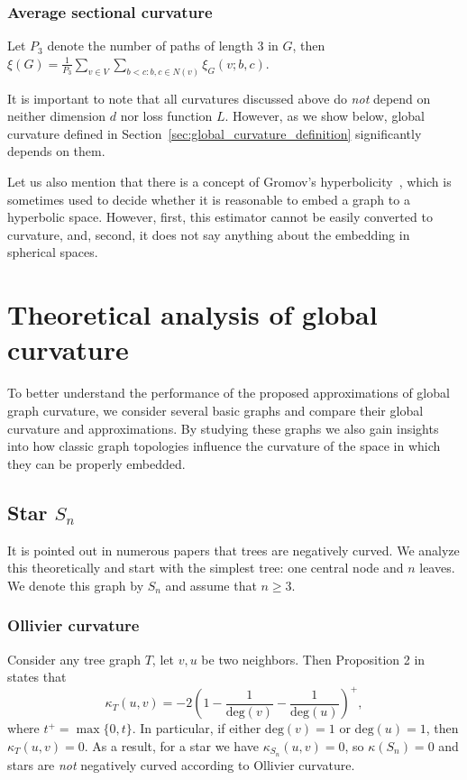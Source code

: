 \documentclass[runningheads]{llncs}
\newcommand{\ch}[1]{{\color{red} #1}}
\begin{document}
\subsubsection{Average sectional curvature} Let $P_3$ denote the number of paths of length 3 in $G$, then $\xi(G) = \frac{1}{P_3} \sum\limits_{v \in V }\sum\limits_{b<c: b,c\in N(v)} \xi_G(v;b,c)$.

It is important to note that all curvatures discussed above do \textit{not} depend on neither dimension $d$ nor loss function $L$. However, as we show below, global curvature defined in Section~\ref{sec:global_curvature_definition} significantly depends on them.

Let us also mention that there is a concept of Gromov's hyperbolicity~\cite{gromov1987hyperbolic}, which is sometimes used to decide whether it is reasonable to embed a graph to a hyperbolic space. However, first, this estimator cannot be easily converted to curvature, and, second, it does not say anything about the \ch{embedding in spherical spaces.}

\section{Theoretical analysis of global curvature}\label{sec:theory}

To better understand the performance of the proposed approximations of global graph curvature,
we consider several basic graphs and compare their global curvature and approximations. 
By studying these graphs we \ch{also gain insights} into how classic graph topologies influence the curvature of the space in which they can be properly embedded. 

\subsection{Star $S_n$}\label{sec:S_n}

It is pointed out in numerous papers that trees are negatively curved. 
We analyze this theoretically and start with the simplest tree: one central node and $n$ leaves. We denote this graph by $S_n$ and assume that $n \ge 3$.

\subsubsection{Ollivier curvature} 
Consider any tree graph $T$, let $v, u$ be two neighbors. Then Proposition 2 in~\cite{jost2014ollivier} states that
\begin{equation}\label{eq:ollivier_tree}
	\kappa_T(u,v) = -2\left(1 - \frac{1}{\mathrm{deg}(v)} - \frac{1}{\mathrm{deg}(u)}\right)^+, 
\end{equation}
where $t^+ = \max\{0,t\}$. In particular, if either $\mathrm{deg}(v) = 1$ or $\mathrm{deg}(u) = 1$, then $\kappa_T(u,v) = 0$.  As a result, for a star we have $\kappa_{S_n}(u,v) = 0$, so $\kappa(S_n) = 0$ and stars are \textit{not} negatively curved according to Ollivier curvature.
\end{document}
